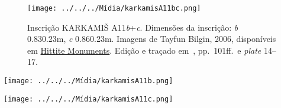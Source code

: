 \begin{figure}[h]
	\centering
	\texttt{[image: ../../../Mídia/karkamisA11bc.png]}

	\caption[KARKAMIŠ A11\emph{b}+\emph{c}]{Inscrição KARKAMIŠ A11\emph{b}+\emph{c}.
		Dimensões da inscrição:
		\emph{b} 0.83\times0.23m,
		\emph{c} 0.86\times0.23m.
		Imagens de Tayfun Bilgin, 2006,
		disponíveis em
		\href{https://www.hittitemonuments.com/karkamis/kargamis43.htm}{Hittite Monuments}.
		Edição e traçado em~, pp.\ 101ff.\ e \emph{plate}
		14--17.
	}\label{fig:karkamisA11b}
\end{figure}

\begin{center}
	\texttt{[image: ../../../Mídia/karkamisA11b.png]}
\end{center}

\clearpage

\begin{center}
	\texttt{[image: ../../../Mídia/karkamisA11c.png]}
\end{center}

\clearpage

